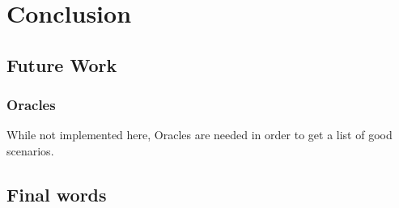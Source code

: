 \chapter{Conclusion}
\section{Future Work}
\subsection{Oracles}
While not implemented here, Oracles are needed in order to get a list of good scenarios.


\section{Final words}